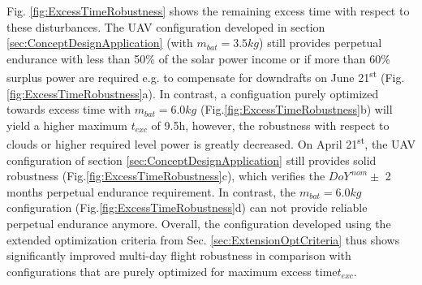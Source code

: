 Fig. \ref{fig:ExcessTimeRobustness} shows the remaining excess time with respect to these disturbances. The UAV configuration developed in section \ref{sec:ConceptDesignApplication} (with $m_{bat}=3.5kg$) still provides perpetual endurance with less than 50\% of the solar power income or if more than 60\% surplus power are required e.g. to compensate for downdrafts on June 21\textsuperscript{st} (Fig.\ref{fig:ExcessTimeRobustness}a). In contrast, a configuation purely optimized towards excess time with $m_{bat}=6.0kg$ (Fig.\ref{fig:ExcessTimeRobustness}b) will yield a higher maximum $t_{exc}$ of 9.5h, however, the robustness with respect to clouds or higher required level power is greatly decreased. On April  21\textsuperscript{st}, the UAV configuration of section \ref{sec:ConceptDesignApplication} still provides solid robustness (Fig.\ref{fig:ExcessTimeRobustness}c), which verifies the $DoY^{\,nom}\pm$ 2 months perpetual endurance requirement. In contrast, the $m_{bat}=6.0kg$ configuration (Fig.\ref{fig:ExcessTimeRobustness}d) can not provide reliable perpetual endurance anymore. Overall, the configuration developed using the extended optimization criteria from Sec. \ref{sec:ExtensionOptCriteria} thus shows significantly improved multi-day flight robustness in comparison with configurations that are purely optimized for maximum excess time$t_{exc}$.